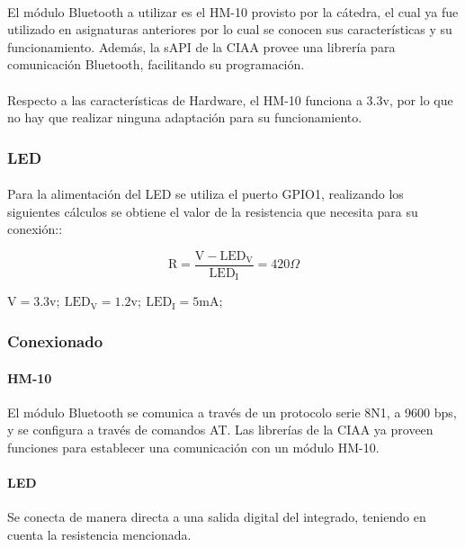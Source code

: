 \paragraph{}El módulo Bluetooth a utilizar es el HM-10 provisto por la cátedra, el cual ya
fue utilizado en asignaturas anteriores por lo cual se conocen sus características 
y su funcionamiento.
Además, la sAPI de la CIAA provee una librería para comunicación Bluetooth, facilitando 
su programación.

\paragraph{}Respecto a las características de Hardware, el HM-10 funciona a 3.3v, por lo que
no hay que realizar ninguna adaptación para su funcionamiento.

\subsubsection{LED}

\paragraph{}Para la alimentación del LED se utiliza el puerto GPIO1, realizando los 
siguientes cálculos se obtiene el valor de la resistencia que necesita 
para su conexión::


$$ \mathrm{R} = \frac{\mathrm{V} - \mathrm{LED_V}}{\mathrm{LED_I}} = 420\Omega $$

$ \mathrm{V} = 3.3\mathrm{v};\ \mathrm{LED_V} = 1.2\mathrm{v};\ \mathrm{LED_I} = 5\mathrm{mA};  $

\subsubsection{Conexionado}

\paragraph{HM-10} El módulo Bluetooth se comunica a través de un protocolo serie 8N1,
a 9600 bps, y se configura a través de comandos AT. Las librerías de la CIAA
ya proveen funciones para establecer una comunicación con un módulo HM-10.

\paragraph{LED}Se conecta de manera directa a una salida digital del integrado, 
teniendo en cuenta la resistencia mencionada.

